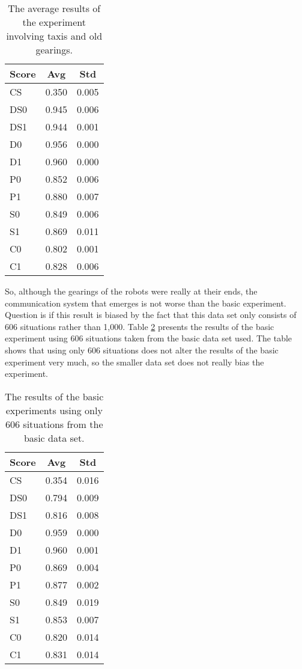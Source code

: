 \begin{table}
\centering
\begin{tabular}{||l|c|c||}
\hline\hline
Score & Avg & Std\\\hline
CS & 0.350 & 0.005\\\hline
DS0 & 0.945 & 0.006\\\hline
DS1 & 0.944 & 0.001\\\hline
D0 & 0.956 & 0.000\\\hline
D1 & 0.960 & 0.000\\\hline
P0 & 0.852 & 0.006\\\hline
P1 & 0.880 & 0.007\\\hline
S0 & 0.849 & 0.006\\\hline
S1 & 0.869 & 0.011\\\hline
C0 & 0.802 & 0.001\\\hline
C1 & 0.828 & 0.006\\\hline
\hline
\end{tabular}
\caption{The average results of the experiment involving taxis and old gearings.}
\label{t:int:taxis}
\end{table}

So, although the gearings of the robots were really at their ends, the communication system that emerges is not worse than the basic experiment. Question is if this result is biased by the fact that this data set only consists of 606 situations rather than 1,000. Table \ref{t:int:basis606} presents the results of the basic experiment using 606 situations taken from the basic data set used. The table shows that using only 606 situations does not alter the results of the basic experiment very much, so the smaller data set does not really bias the experiment. 

\begin{table}
\centering
\begin{tabular}{||l|c|c||}
\hline\hline
Score & Avg & Std\\\hline
CS & 0.354 & 0.016\\\hline
DS0 & 0.794 & 0.009\\\hline
DS1 & 0.816 & 0.008\\\hline
D0 & 0.959 & 0.000\\\hline
D1 & 0.960 & 0.001\\\hline
P0 & 0.869 & 0.004\\\hline
P1 & 0.877 & 0.002\\\hline
S0 & 0.849 & 0.019\\\hline
S1 & 0.853 & 0.007\\\hline
C0 & 0.820 & 0.014\\\hline
C1 & 0.831 & 0.014\\\hline
\hline
\end{tabular}
\caption{The results of the basic experiments using only 606 situations from the basic data set.}
\label{t:int:basis606}
\end{table}

